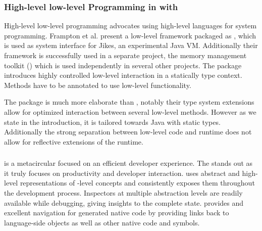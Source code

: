 \subsubsection*{High-level low-level Programming in \Jikes with \MMTK}

High-level low-level programming \cite{Fram09a} advocates using high-level languages for system programming.
Frampton et al. present a low-level framework packaged as , which is used as system interface for Jikes, an experimental Java VM.
Additionally their framework is successfully used in a separate project, the memory management toolkit (\MMTK) \cite{Blac04a} which is used independently in several other projects.
The  package introduces highly controlled low-level interaction in a statically type context.
Methods have to be annotated to use low-level functionality. 

The  package is much more elaborate than \NB, notably their type system extensions allow for optimized interaction between several low-level methods.
However as we state in the introduction, it is tailored towards Java with static types.
Additionally the strong separation between low-level code and runtime does not allow for reflective extensions of the runtime.

\subsubsection*{\Maxine \Java \VM}
\Maxine is a metacircular \Java \VM \cite{Wimm13a} focused on an efficient developer experience.
The \Maxine \VM stands out as it truly focuses on productivity and developer interaction.
\Maxine uses abstract and high-level representations of \VM-level concepts and consistently exposes them throughout the development process.
Inspectors at multiple abstraction levels are readily available while debugging, giving insights to the complete \VM state.
\Maxine provides and excellent navigation for generated native code by providing links back to language-side objects as well as other native code and symbols.

